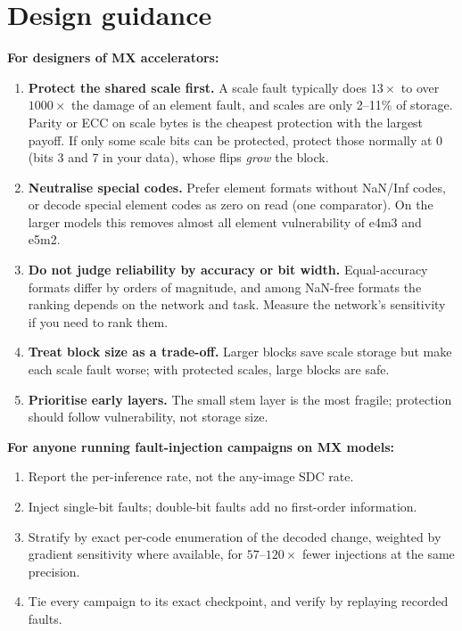 \section{Design guidance}
\label{sec:guidance}
\textbf{For designers of MX accelerators:}
\begin{enumerate}
\item \textbf{Protect the shared scale first.} A scale fault typically does $13\times$ to over $1000\times$ the damage of an element fault, and scales are only 2--11\% of storage. Parity or ECC on scale bytes is the cheapest protection with the largest payoff. If only some scale bits can be protected, protect those normally at 0 (bits 3 and 7 in your data), whose flips \emph{grow} the block.
\item \textbf{Neutralise special codes.} Prefer element formats without NaN/Inf codes, or decode special element codes as zero on read (one comparator). On the larger models this removes almost all element vulnerability of e4m3 and e5m2.
\item \textbf{Do not judge reliability by accuracy or bit width.} Equal-accuracy formats differ by orders of magnitude, and among NaN-free formats the ranking depends on the network and task. Measure the network's sensitivity if you need to rank them.
\item \textbf{Treat block size as a trade-off.} Larger blocks save scale storage but make each scale fault worse; with protected scales, large blocks are safe.
\item \textbf{Prioritise early layers.} The small stem layer is the most fragile; protection should follow vulnerability, not storage size.
\end{enumerate}
\textbf{For anyone running fault-injection campaigns on MX models:}
\begin{enumerate}[resume]
\item Report the per-inference rate, not the any-image SDC rate.
\item Inject single-bit faults; double-bit faults add no first-order information.
\item Stratify by exact per-code enumeration of the decoded change, weighted by gradient sensitivity where available, for $57$--$120\times$ fewer injections at the same precision.
\item Tie every campaign to its exact checkpoint, and verify by replaying recorded faults.
\end{enumerate}

